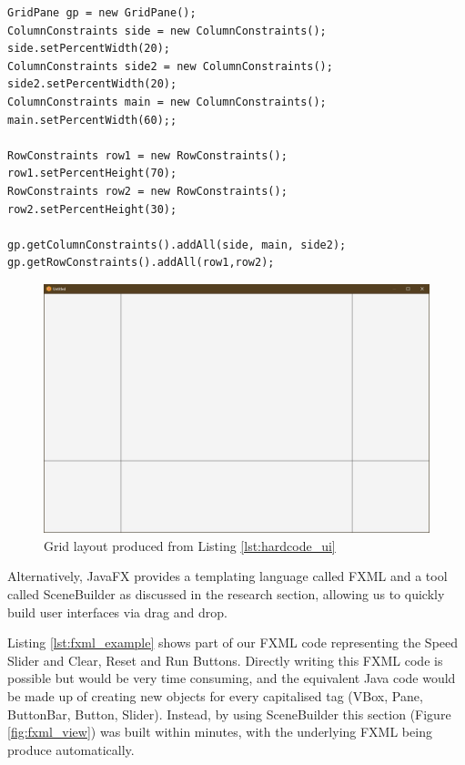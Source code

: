 \begin{lstlisting}[caption=Example of hard coding grid layout with the resulting view in Figure \ref{fig:gridss}, label=lst:hardcode_ui]
GridPane gp = new GridPane();
ColumnConstraints side = new ColumnConstraints();
side.setPercentWidth(20);
ColumnConstraints side2 = new ColumnConstraints();
side2.setPercentWidth(20);
ColumnConstraints main = new ColumnConstraints();
main.setPercentWidth(60);;

RowConstraints row1 = new RowConstraints();
row1.setPercentHeight(70);
RowConstraints row2 = new RowConstraints();
row2.setPercentHeight(30);

gp.getColumnConstraints().addAll(side, main, side2);
gp.getRowConstraints().addAll(row1,row2);
\end{lstlisting}

\begin{figure}[h]
    \centering
    \includegraphics[width=\textwidth]{dissertation/DATA/grid layout.jpg}
    \caption{Grid layout produced from Listing \ref{lst:hardcode_ui}}
    \label{fig:gridss}
\end{figure}

Alternatively, JavaFX \cite{sunmicrosystems_2022_javafx} provides a templating language called FXML and a tool called SceneBuilder \cite{gluon_2022_scene} as discussed in the research section, allowing us to quickly build user interfaces via drag and drop.

Listing \ref{lst:fxml_example} shows part of our FXML code representing the Speed Slider and Clear, Reset and Run Buttons. Directly writing this FXML code is possible but would be very time consuming, and the equivalent Java code would be made up of creating new objects for every capitalised tag (VBox, Pane, ButtonBar, Button, Slider). Instead, by using SceneBuilder \cite{gluon_2022_scene} this section (Figure \ref{fig:fxml_view}) was built within minutes, with the underlying FXML being produce automatically.

